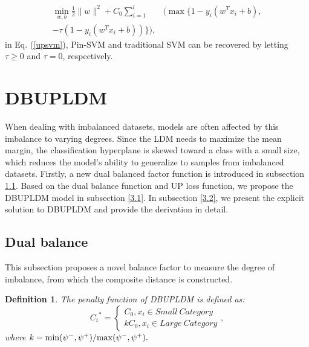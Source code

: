 \documentclass[a4paper]{cas-sc}
\newtheorem{myDef}{Definition}
\begin{document}
\begin{equation}
\begin{aligned}
\label{upsvm}
\min _{w, b} \frac{1}{2}\|w\|^{2} + C_{0} \sum_{i=1}^{l} &(\operatorname { m a x } \{1-y_{i}(w^{T} x_{i}+b),\\
-\tau(1-y_{i}(w^{T} x_{i}+b))\}),
\end{aligned}
\end{equation}
in Eq. (\ref{upsvm}), Pin-SVM and traditional SVM can be recovered by letting $\tau \geq 0$ and $\tau=0$, respectively.

\section{DBUPLDM}\label{3}
When dealing with imbalanced datasets, models are often affected by this imbalance to varying degrees. Since the LDM needs to maximize the mean margin, the classification hyperplane is skewed toward a class with a small size, which reduces the model's ability to generalize to samples from imbalanced datasets. Firstly, a new dual balanced factor function is introduced in subsection \ref{dbb}.
Based on the dual balance function and UP loss function, we propose the DBUPLDM model in subsection \ref{3.1}. In subsection \ref{3.2}, we present the explicit solution to DBUPLDM and provide the derivation in detail. 

\subsection{Dual balance } \label{dbb}
This subsection proposes a novel balance factor to measure the degree of imbalance, from which the composite distance is constructed.

\begin{myDef}\label{pf}
The penalty function of DBUPLDM is defined as:
\begin{equation}
{C_i}^* = \left\{ \begin{array}{l}
{C_0},{x_i} \in {{Small \  Category}}\\
k{C_0},{x_i} \in {{Large \ Category}}
\end{array} \right.,
\end{equation}
where $k = {{\min ({\psi ^ - },{\psi ^ + })} \mathord{\left/
 {\vphantom {{\min ({\psi ^ - },{\psi ^ + })} {\max ({\psi ^ - },{\psi ^ + })}}} \right.
 \kern-\nulldelimiterspace} {\max ({\psi ^ - },{\psi ^ + })}}.$
\end{myDef}
\end{document}
